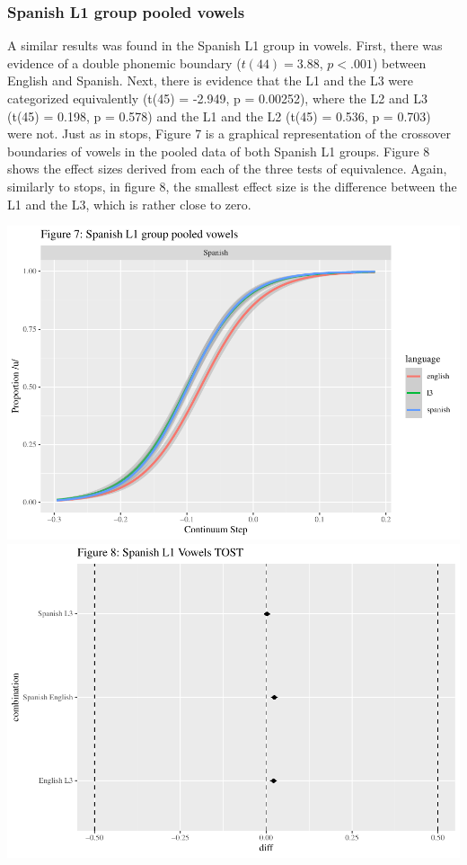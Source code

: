 \documentclass[
  english,
  man]{apa6}
\begin{document}
\hypertarget{spanish-l1-group-pooled-vowels}{%
\subsubsection{Spanish L1 group pooled vowels}\label{spanish-l1-group-pooled-vowels}}

A similar results was found in the Spanish L1 group in vowels. First, there was evidence of a double phonemic boundary (\(t(44) = 3.88\), \(p < .001\)) between English and Spanish.
Next, there is evidence that the L1 and the L3 were categorized equivalently (t(45) = -2.949, p = 0.00252), where the L2 and L3 (t(45) = 0.198, p = 0.578) and the L1 and the L2 (t(45) = 0.536, p = 0.703) were not.
Just as in stops, Figure 7 is a graphical representation of the crossover boundaries of vowels in the pooled data of both Spanish L1 groups.
Figure 8 shows the effect sizes derived from each of the three tests of equivalence.
Again, similarly to stops, in figure 8, the smallest effect size is the difference between the L1 and the L3, which is rather close to zero.

\includegraphics{master_files/figure-latex/unnamed-chunk-9-1.pdf} \includegraphics{master_files/figure-latex/unnamed-chunk-9-2.pdf}
\end{document}

